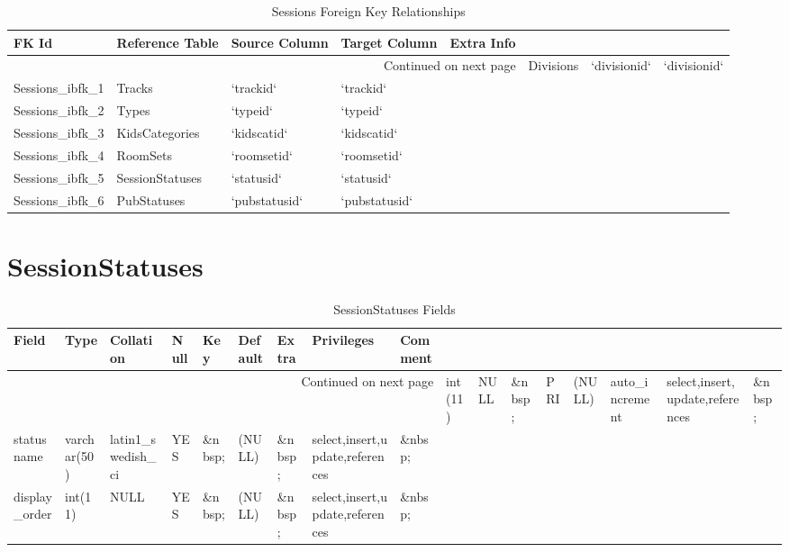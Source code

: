 \documentclass[tablesignature,landscape]{scrartcl}
\begin{document}
\begin{longtable}{|l|l|l|l|l|}
\caption{Sessions Foreign Key Relationships} \label{tbl:sessionsfkr}\\
\hline
 FK Id                  &  Reference Table  &  Source Column  &  Target Column  &  Extra Info \\
\hline
\endhead
\hline\multicolumn{5}{r}{Continued on next page}\
\endfoot
\endlastfoot
\hline
 Sessions\_{}ibfk\_{}7  &  Divisions        &  `divisionid`   &  `divisionid`   &              \\
 Sessions\_{}ibfk\_{}1  &  Tracks           &  `trackid`      &  `trackid`      &              \\
 Sessions\_{}ibfk\_{}2  &  Types            &  `typeid`       &  `typeid`       &              \\
 Sessions\_{}ibfk\_{}3  &  KidsCategories   &  `kidscatid`    &  `kidscatid`    &              \\
 Sessions\_{}ibfk\_{}4  &  RoomSets         &  `roomsetid`    &  `roomsetid`    &              \\
 Sessions\_{}ibfk\_{}5  &  SessionStatuses  &  `statusid`     &  `statusid`     &              \\
 Sessions\_{}ibfk\_{}6  &  PubStatuses      &  `pubstatusid`  &  `pubstatusid`  &              \\
\hline
\end{longtable}
\section{SessionStatuses}
\label{sec-30}


\begin{longtable}{|l|l|l|l|l|l|l|l|l|}
\caption{SessionStatuses Fields} \label{tbl:sessionstatusesfields}\\
\hline
 Field             &  Type         &  Collation                &  Null     &  Key      &  Default  &  Extra              &  Privileges                       &  Comment \\
\hline
\endhead
\hline\multicolumn{9}{r}{Continued on next page}\
\endfoot
\endlastfoot
\hline
 statusid          &  int(11)      &  NULL                     &  \&nbsp;  &  PRI      &  (NULL)   &  auto\_{}increment  &  select,insert,update,references  &  \&nbsp;  \\
 statusname        &  varchar(50)  &  latin1\_{}swedish\_{}ci  &  YES      &  \&nbsp;  &  (NULL)   &  \&nbsp;            &  select,insert,update,references  &  \&nbsp;  \\
 display\_{}order  &  int(11)      &  NULL                     &  YES      &  \&nbsp;  &  (NULL)   &  \&nbsp;            &  select,insert,update,references  &  \&nbsp;  \\
\hline
\end{longtable}
\end{document}
